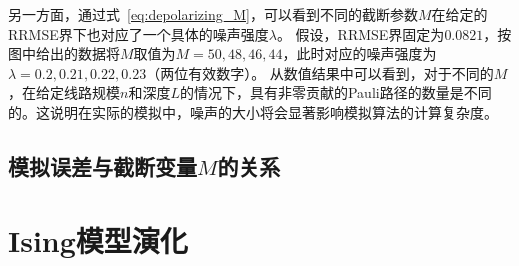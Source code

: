 另一方面，通过式~\ref{eq:depolarizing_M}，可以看到不同的截断参数$M$在给定的RRMSE界下也对应了一个具体的噪声强度$\lambda$。
假设，RRMSE界固定为$0.0821$，按图中给出的数据将$M$取值为$M=50,48,46,44$，此时对应的噪声强度为$\lambda=0.2,0.21,0.22,0.23$（两位有效数字）。
从数值结果中可以看到，对于不同的$M$，在给定线路规模$n$和深度$L$的情况下，具有非零贡献的Pauli路径的数量是不同的。这说明在实际的模拟中，噪声的大小将会显著影响模拟算法的计算复杂度。


\subsection{模拟误差与截断变量$M$的关系}


\section{Ising模型演化}